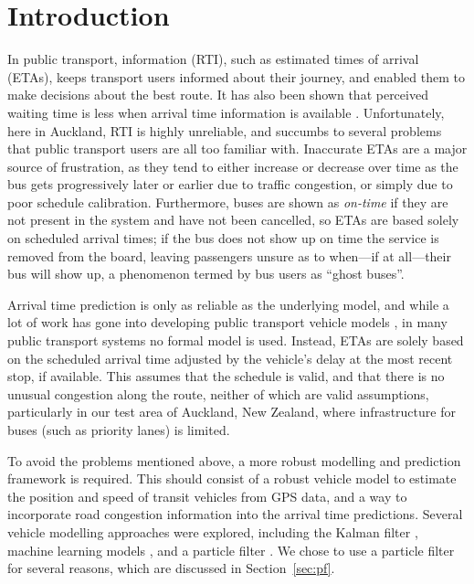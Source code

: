 \section{Introduction}
\label{sec:intro}


In public transport, \rt information (RTI), such as estimated times of arrival (ETAs),
keeps transport users informed about their journey,
and enabled them to make decisions about the best route.
It has also been shown that perceived waiting time is less
when arrival time information is available \citep{TCRP_2003b}.
Unfortunately, here in Auckland, RTI is highly unreliable,
and succumbs to several problems that public transport users
are all too familiar with.
Inaccurate ETAs are a major source of frustration,
as they tend to either increase or decrease over time 
as the bus gets progressively later or earlier due to traffic congestion, 
or simply due to poor schedule calibration.
Furthermore, buses are shown as \emph{on-time} 
if they are not present in the \rt system and have not been cancelled,
so ETAs are based solely on scheduled arrival times;
if the bus does not show up on time
the service is removed from the \rt board,
leaving passengers unsure as to when---if at all---their bus will show up,
a phenomenon termed by bus users as ``ghost buses''.


Arrival time prediction is only as reliable as the underlying model,
and while a lot of work has gone into developing public transport vehicle models
\citep{Cathey_2003,Jeong_2005,Yu_2011,Hans_2015},
in many public transport systems no formal model is used.
Instead, ETAs are solely based on the scheduled arrival time
adjusted by the vehicle's delay at the most recent stop, if available.
This assumes that the schedule is valid,
and that there is no unusual congestion along the route,
neither of which are valid assumptions,
particularly in our test area of Auckland, New Zealand,
where infrastructure for buses (such as priority lanes) is limited.


To avoid the problems mentioned above,
a more robust modelling and prediction framework is required.
This should consist of a robust vehicle model to estimate the position and speed
of transit vehicles from \rt GPS data,
and a way to incorporate road congestion information 
into the arrival time predictions.
Several vehicle modelling approaches were explored, 
including the Kalman filter \citep{Dailey_2001,Cathey_2003},
machine learning models \citep{Yu_2006,Chang_2010},
and a particle filter \citep{Hans_2015}.
We chose to use a particle filter for several reasons,
which are discussed in Section~\ref{sec:pf}.


